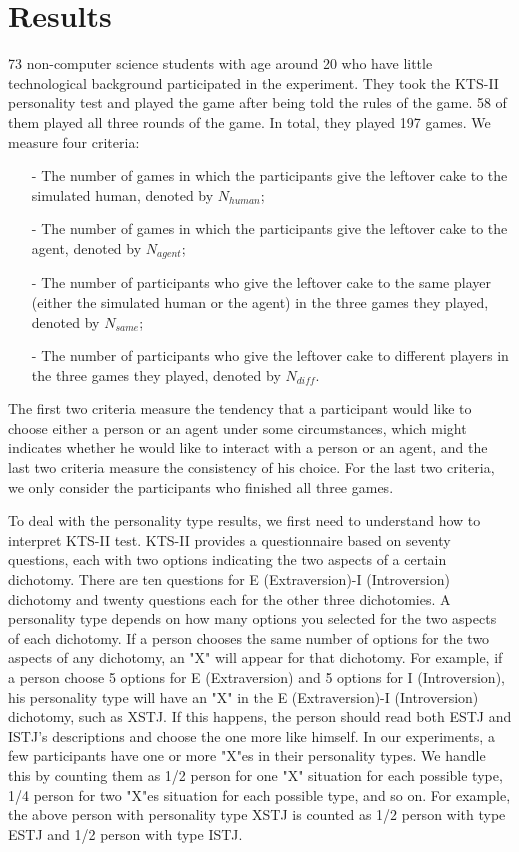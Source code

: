 \section{Results}
\label{ch4:results}
73 non-computer science students with age around 20 who have little technological background participated in the experiment. They took the KTS-II personality test and played the game after being told the rules of the game. 58 of them played all three rounds of the game. In total, they played 197 games. We measure four criteria: 
\begin{itemize}
\item[-]The number of games in which the participants give the leftover cake to the simulated human, denoted by $N_{human}$;
\item[-]The number of games in which the participants give the leftover cake to the agent, denoted by $N_{agent}$;
\item[-]The number of participants who give the leftover cake to the same player (either the simulated human or the agent) in the three games they played, denoted by $N_{same}$;
\item[-]The number of participants who give the leftover cake to different players in the three games they played, denoted by $N_{diff}$.
\end{itemize}

The first two criteria measure the tendency that a participant would like to choose either a person or an agent under some circumstances, which might indicates whether he would like to interact with a person or an agent, and the last two criteria measure the consistency of his choice. For the last two criteria, we only consider the participants who finished all three games.
     
To deal with the personality type results, we first need to understand how to interpret KTS-II test. KTS-II provides a questionnaire based on seventy questions, each with two options indicating the two aspects of a certain dichotomy. There are ten questions for E (Extraversion)-I (Introversion) dichotomy and twenty questions each for the other three dichotomies. A personality type depends on how many options you selected for the two aspects of each dichotomy. If a person chooses the same number of options for the two aspects of any dichotomy, an "X" will appear for that dichotomy. For example, if a person choose 5 options for E (Extraversion) and 5 options for I (Introversion), his personality type will have an "X" in the E (Extraversion)-I (Introversion) dichotomy, such as XSTJ. If this happens, the person should read both ESTJ and ISTJ's descriptions and choose the one more like himself. In our experiments, a few participants have one or more "X"es in their personality types. We handle this by counting them as 1/2 person for one "X" situation for each possible type, 1/4 person for two "X"es situation for each possible type, and so on. For example, the above person with personality type XSTJ is counted as 1/2 person with type ESTJ and 1/2 person with type ISTJ.

